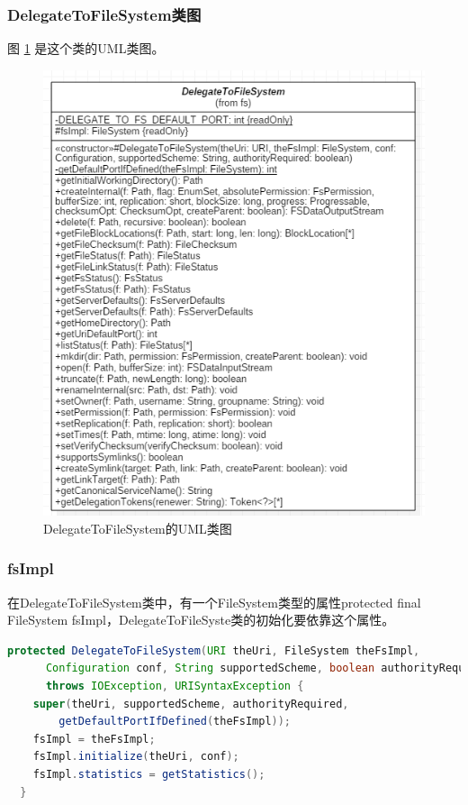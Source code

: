 \subsubsection{DelegateToFileSystem类图}
图 \ref{fig:DelegateToFileSystem} 是这个类的UML类图。
\begin{figure}
\centering
\includegraphics[width=1\linewidth]{UML/abstractfilesystem/DelegateToFileSystem.PNG}
\caption{DelegateToFileSystem的UML类图}
\label{fig:DelegateToFileSystem}
\end{figure}

\subsubsection{fsImpl}
在DelegateToFileSystem类中，有一个FileSystem类型的属性protected final FileSystem fsImpl，DelegateToFileSyste类的初始化要依靠这个属性。
\begin{lstlisting}[language=Java]
protected DelegateToFileSystem(URI theUri, FileSystem theFsImpl,
      Configuration conf, String supportedScheme, boolean authorityRequired)
      throws IOException, URISyntaxException {
    super(theUri, supportedScheme, authorityRequired,
        getDefaultPortIfDefined(theFsImpl));
    fsImpl = theFsImpl;
    fsImpl.initialize(theUri, conf);
    fsImpl.statistics = getStatistics();
  }
\end{lstlisting}

